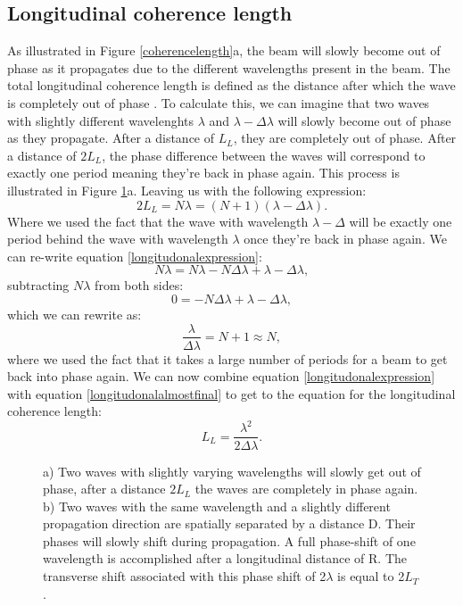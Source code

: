 \subsection{Longitudinal coherence length}
As illustrated in Figure \ref{coherencelength}a, the beam will slowly become out of phase as it propagates due to the different wavelengths present in the beam. The total longitudinal coherence length is defined as the distance after which the wave is completely out of phase \cite{thesis_fredrik}. To calculate this, we can imagine that two waves with slightly different wavelenghts $\lambda$ and $\lambda - \Delta \lambda$ will slowly become out of phase as they propagate. After a distance of $L_L$, they are completely out of phase. After a distance of $2L_L$, the phase difference between the waves will correspond to exactly one period meaning they're back in phase again. This process is illustrated in Figure \ref{geometrycoherence}a. Leaving us with the following expression:
\begin{equation}\label{longitudonalexpression}
	2L_L = N\lambda = (N + 1)(\lambda - \Delta \lambda).
\end{equation}
Where we used the fact that the wave with wavelength $\lambda - \Delta$ will be exactly one period behind the wave with wavelength $\lambda$ once they're back in phase again. We can re-write equation \ref{longitudonalexpression}:
\begin{equation}
	N\lambda = N\lambda - N\Delta\lambda + \lambda - \Delta \lambda,
\end{equation}
subtracting $N\lambda$ from both sides:
\begin{equation}
	0 = -N\Delta \lambda + \lambda - \Delta \lambda,
\end{equation}
which we can rewrite as:
\begin{equation}\label{longitudonalalmostfinal}
	\frac{\lambda}{\Delta \lambda} = N + 1 \approx N,
\end{equation}
where we used the fact that it takes a large number of periods for a beam to get back into phase again. We can now combine equation \ref{longitudonalexpression} with equation \ref{longitudonalalmostfinal} to get to the equation for the longitudinal coherence length:
\begin{equation}
	L_L = \frac{\lambda^2}{2 \Delta \lambda}.
\end{equation}
\begin{figure}
	\centering
	\def\svgwidth{\textwidth}
	
	\caption{a) Two waves with slightly varying wavelengths will slowly get out of phase, after a distance $2L_L$ the waves are completely in phase again. b) Two waves with the same wavelength and a slightly different propagation direction are spatially separated by a distance D. Their phases will slowly shift during propagation. A full phase-shift of one wavelength is accomplished after a longitudinal distance of R. The transverse shift associated with this phase shift of 2$\lambda$ is equal to 2$L_T$.}
	\label{geometrycoherence}
\end{figure}
